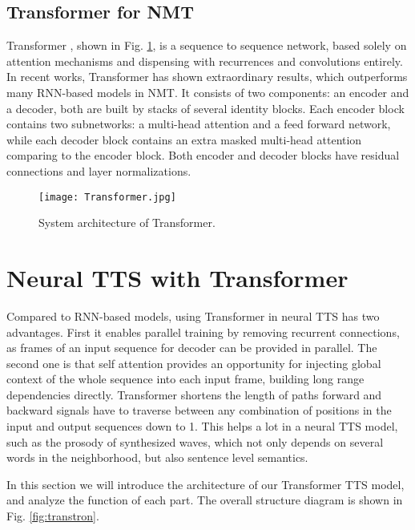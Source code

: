 \documentclass[letterpaper]{article} \usepackage{aaai19}  \usepackage{times}  \usepackage{helvet}  \usepackage{courier}  \usepackage{url}  \usepackage{graphicx}  \frenchspacing
\begin{document}
\subsection{Transformer for NMT}
\label{subsec:transformer}

Transformer \cite{vaswani2017attention}, shown in Fig. \ref{fig:transformer}, is a sequence to sequence network, based solely on attention mechanisms and dispensing with recurrences and convolutions entirely. In recent works, Transformer has shown extraordinary results, which outperforms many RNN-based models in NMT. It consists of two components: an encoder and a decoder, both are built by stacks of several identity blocks. Each encoder block contains two subnetworks: a multi-head attention and a feed forward network, while each decoder block contains an extra masked multi-head attention comparing to the encoder block. Both encoder and decoder blocks have residual connections and layer normalizations.

\begin{figure}[!tb]
  \centering
  \texttt{[image: Transformer.jpg]}
  \caption{System architecture of Transformer.}
  \label{fig:transformer}
\end{figure}



\section{Neural TTS with Transformer}

Compared to RNN-based models, using Transformer in neural TTS has two advantages. First it enables parallel training by removing recurrent connections, as frames of an input sequence for decoder can be provided in parallel. The second one is that self attention provides an opportunity for injecting global context of the whole sequence into each input frame, building long range dependencies directly. Transformer shortens the length of paths forward and backward signals have to traverse between any combination of positions in the input and output sequences down to 1. This helps a lot in a neural TTS model, such as the prosody of synthesized waves, which not only depends on several words in the neighborhood, but also sentence level semantics.

In this section we will introduce the architecture of our Transformer TTS model, and analyze the function of each part. The overall structure diagram is shown in Fig. \ref{fig:transtron}.
\end{document}
